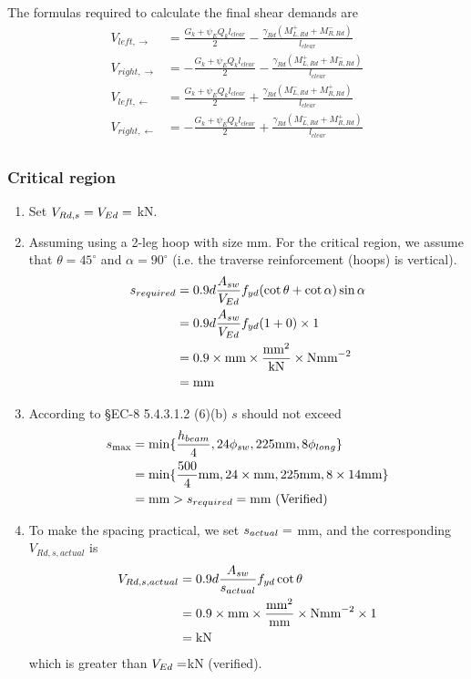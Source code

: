 \newcommand{\Va}{\frac{G_k+\psi_EQ_k l_{clear}}{2}}
\newcommand{\Vb}{\frac{\gamma_{Rd}(M_{L,Rd}^+ + M_{R,Rd}^- )}{l_{clear}}}
\newcommand{\Vc}{\frac{\gamma_{Rd}(M_{L,Rd}^- + M_{R,Rd}^+ )}{l_{clear}}}
The formulas required to calculate the final shear demands are
\begin{align*}
  V_{left, \rightarrow } &= \Va - \Vb \\
  V_{right, \rightarrow } &= -\Va - \Vb \\
  V_{left, \leftarrow } &= \Va + \Vc \\
  V_{right, \leftarrow } &= -\Va + \Vc \\
\end{align*}
\subsubsection{Critical region}
\begin{enumerate}
\item Set $V_{Rd,s} = V_{Ed} = \g{VEd}$ kN.
\item Assuming using a 2-leg hoop with size  mm. For the critical
  region, we assume that $\theta = 45 ^{\circ}$ and $\alpha = 90 ^{\circ}$ (i.e.
  the traverse reinforcement (hoops) is vertical).
  \begin{align*}
    s_{required} &= 0.9d \frac{A_{sw}}{V_{Ed}} f_{yd}
                   (\cot \theta + \cot \alpha)\sin \alpha \\
                 &= 0.9d \frac{A_{sw}}{V_{Ed}} f_{yd} (1 + 0) \times 1\\
                 &= 0.9 \times \g{d} \mbox{mm}
                   \times
                   \frac{\g{Asw}\mbox{mm}^{2}}{\g{VEd} \mbox{kN}}
                   \times \g{fyd} \mbox{Nmm}^{-2} \\
                 &= \g{sreq} \mbox{mm}
  \end{align*}
\item According to \S EC-8 5.4.3.1.2 (6)(b) $s$ should not exceed
  \begin{align*}
    s_{\max} &= \min \{ \frac{h_{beam}}{4}, 24\phi_{sw},
               225\mbox{mm}, 8\phi_{long} \} \\
             &= \min \{ \frac{500}{4} \mbox{mm}, 24 \times \g{dh} \mbox{mm},
               225\mbox{mm}, 8 \times 14 \mbox{mm}\} \\
             &= \g{smax}
               \mbox{mm} > s_{required} = \g{sreq} \mbox{mm (Verified)} \\
  \end{align*}
\item To make the spacing practical, we set $s_{actual} = \g{sact}$ mm, and
  the corresponding $V_{Rd, s, actual} $ is
\begin{align*}
  V_{Rd, s, actual}&= 0.9d \frac{A_{sw}}{s_{actual}}f_{yd}\cot  \theta \\
  &= 0.9 \times \g{d} \mbox{mm}
  \times \frac{\g{Asw} \mbox{mm}^{2}}{\g{sact} \mbox{mm}}
  \times \g{fyd} \mbox{Nmm}^{-2} \times 1 \\
  &= \g{VRdsAct} \mbox{kN}
\end{align*}
  which is greater than $V_{Ed} = \g{VEd} $kN (verified).
\end{enumerate}

